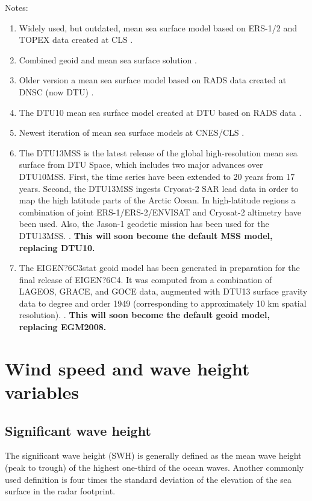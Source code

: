 \documentclass[a4paper,11pt,openany,natbib]{thesis}
\begin{document}
Notes:
\begin{enumerate}
\item Widely used, but outdated, mean sea surface model based on ERS-1/2 and TOPEX data created at CLS \citep{hernandez2001}.\label{item:mss_cls01}
\item Combined geoid and mean sea surface solution \citep{pavlis2008}.\label{item:mss_egm2008}\label{item:geoid_egm2008}
\item Older version a mean sea surface model based on RADS data created at DNSC (now DTU) \citep{andersen2009}.\label{item:mss_dnsc2008}
\item The DTU10 mean sea surface model created at DTU based on RADS data \citep{andersen2010}.\label{item:mss_dtu10}
\item Newest iteration of mean sea surface models at CNES/CLS \citep{schaeffer2012}.\label{item:mss_cls11}
\item The DTU13MSS is the latest release of the global high-resolution mean sea surface from DTU Space, which includes two major advances over DTU10MSS. First, the time series have been extended to 20 years from 17 years. Second, the DTU13MSS ingests Cryosat-2 SAR lead data in order to map the high latitude parts of the Arctic Ocean. In high-latitude regions a combination of joint ERS-1/ERS-2/ENVISAT and Cryosat-2 altimetry have been used. Also, the Jason-1 geodetic mission has been used for the DTU13MSS. \citep{andersen2013a}.\label{item:mss_dtu13}
\textbf{This will soon become the default MSS model, replacing DTU10.}
\item The EIGEN?6C3stat geoid model has been generated in preparation for the final release of EIGEN?6C4. It was computed from a combination of LAGEOS, GRACE, and GOCE data, augmented with DTU13 surface gravity data to degree and order 1949 (corresponding to approximately 10 km spatial resolution). \citep{forste2013,shako2014}.\label{item:geoid_eigen6}
\textbf{This will soon become the default geoid model, replacing EGM2008.} 
\end{enumerate}

\chapter{Wind speed and wave height variables}
\section{Significant wave height}
\label{var:swh}
The significant wave height (SWH) is generally defined as the mean wave height (peak to trough) of the highest one-third of the ocean waves. Another commonly used definition is four times the standard deviation of the elevation of the sea surface in the radar footprint.
\end{document}
